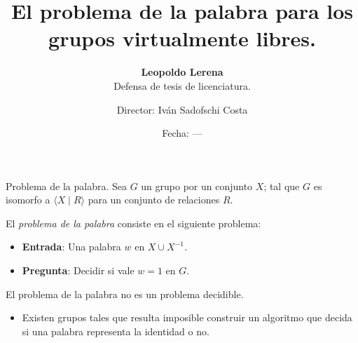 \documentclass[aspectratio=169, 10pt]{beamer}
\title{El problema de la palabra para los grupos virtualmente libres.}
\subtitle{\textbf{Leopoldo Lerena} \\
		Defensa de tesis de licenciatura.}
\date{Fecha: ---}
\author{Director: Iván Sadofschi Costa}
\institute{Universidad de Buenos Aires}
\begin{document}
	\maketitle

	
	
	
	\begin{frame}[fragile]{Problema de la palabra.}
		Sea $G$ un grupo \fg por un conjunto $X$; 
		tal que $G$ es isomorfo a $\langle X \mid R \rangle$ para un conjunto de relaciones $R$.
		
		\pause 

		El \emph{problema de la palabra} consiste en el siguiente problema:
		\pause 
		\begin{itemize}
					\item 
						\textbf{Entrada}: Una palabra $w$ en $X \cup X^{-1}$.
					\pause 
					\item 
						\textbf{Pregunta}: Decidir si vale $w=1$ en $G$.
		\end{itemize}

		El problema de la palabra no es un problema \alert{decidible}.
		\pause 
		\begin{itemize}
			\item 
				Existen grupos tales que resulta imposible construir un algoritmo que decida si una palabra representa la identidad o no.
		\end{itemize}
		
		
	\end{frame}
\end{document}
